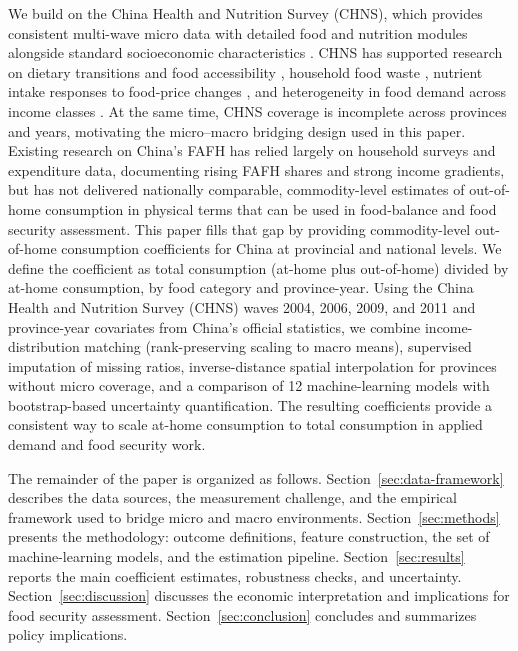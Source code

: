 \documentclass[12pt,a4paper]{article}
\begin{document}
We build on the China Health and Nutrition Survey (CHNS), which provides consistent multi-wave micro data with detailed food and nutrition modules alongside standard socioeconomic characteristics \citep{CHNS_Design,Popkin2010CHNS}. CHNS has supported research on dietary transitions and food accessibility \citep{HuangTian2019}, household food waste \citep{MinWangYu2021}, nutrient intake responses to food-price changes \citep{LiBaiZhu2023}, and heterogeneity in food demand across income classes \citep{Ren2018}. At the same time, CHNS coverage is incomplete across provinces and years, motivating the micro--macro bridging design used in this paper.
Existing research on China’s FAFH has relied largely on household surveys and expenditure data, documenting rising FAFH shares and strong income gradients, but has not delivered nationally comparable, commodity-level estimates of out-of-home consumption in physical terms that can be used in food-balance and food security assessment. This paper fills that gap by providing commodity-level out-of-home consumption coefficients for China at provincial and national levels. We define the coefficient as total consumption (at-home plus out-of-home) divided by at-home consumption, by food category and province-year. Using the China Health and Nutrition Survey (CHNS) waves 2004, 2006, 2009, and 2011 and province-year covariates from China’s official statistics, we combine income-distribution matching (rank-preserving scaling to macro means), supervised imputation of missing ratios, inverse-distance spatial interpolation for provinces without micro coverage, and a comparison of 12 machine-learning models with bootstrap-based uncertainty quantification. The resulting coefficients provide a consistent way to scale at-home consumption to total consumption in applied demand and food security work.

The remainder of the paper is organized as follows. Section~\ref{sec:data-framework} describes the data sources, the measurement challenge, and the empirical framework used to bridge micro and macro environments. Section~\ref{sec:methods} presents the methodology: outcome definitions, feature construction, the set of machine-learning models, and the estimation pipeline. Section~\ref{sec:results} reports the main coefficient estimates, robustness checks, and uncertainty. Section~\ref{sec:discussion} discusses the economic interpretation and implications for food security assessment. Section~\ref{sec:conclusion} concludes and summarizes policy implications.
\end{document}
